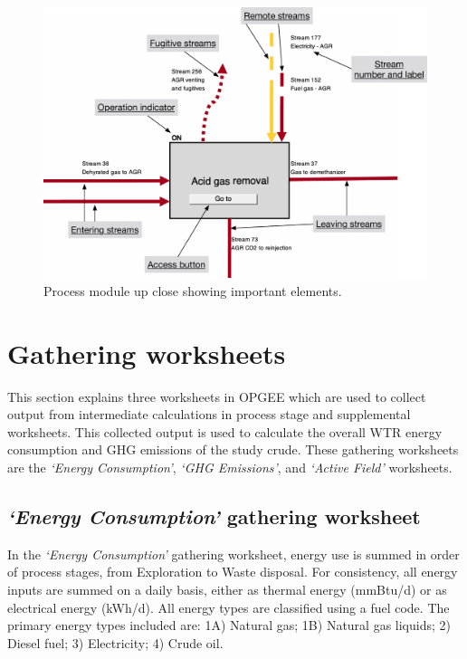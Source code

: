\documentclass[11pt]{report}
\newcommand{\sheet}[1]{\textit{`{#1}'}}
\begin{document}
\begin{figure}[t]
\includegraphics[width=1\columnwidth]{images/Process_mod_diagram.pdf}
\caption{Process module up close showing important elements.}
\label{fig:Process_mod_diagram}
\end{figure}



\chapter{Gathering worksheets}

This section explains three worksheets in OPGEE which are used to collect output from intermediate calculations in process stage and supplemental worksheets. This collected output is used to calculate the overall WTR energy consumption and GHG emissions of the study crude. These gathering worksheets are the \sheet{Energy Consumption}, \sheet{GHG Emissions}, and \sheet{Active Field} worksheets. 


\clearpage

\section{\sheet{Energy Consumption} gathering worksheet}\label{sec:energy_consumption}

In the \sheet{Energy Consumption} gathering worksheet, energy use is summed in order of process stages, from Exploration to Waste disposal. For consistency, all energy inputs are summed on a daily basis, either as thermal energy (mmBtu/d) or as electrical energy (kWh/d). All energy types are classified using a fuel code. The primary energy types included are: 1A) Natural gas; 1B) Natural gas liquids; 2) Diesel fuel; 3) Electricity; 4) Crude oil.
\end{document}
